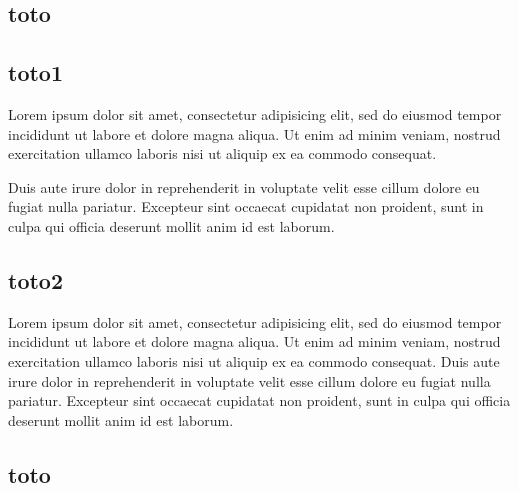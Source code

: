 \documentclass{book}
\begin{document}
\bhookXnote{\singlespacing}
\begin{pages}
\begin{Leftside}
\beginnumbering
\pstart
\section{toto}\skipnumbering
\subsection{toto1}\skipnumbering
\pend
\pstart
\begin{ledgroup}

\skipnumbering Lorem ipsum dolor sit amet, consectetur adipisicing elit, sed do eiusmod tempor incididunt ut labore et dolore magna aliqua. Ut enim ad minim veniam, nostrud exercitation ullamco laboris nisi ut aliquip ex ea commodo consequat.

Duis aute irure dolor in reprehenderit in voluptate velit esse cillum dolore eu fugiat nulla pariatur. Excepteur sint occaecat cupidatat non proident, sunt in culpa qui officia deserunt mollit anim id est laborum.

\end{ledgroup}
\pend

\pstart
\subsection{toto2}
\pend
\pstart
\begin{ledgroup}

 Lorem ipsum dolor sit amet, consectetur adipisicing elit, sed do eiusmod tempor incididunt ut labore et dolore magna aliqua. Ut enim ad minim veniam, nostrud exercitation ullamco laboris nisi ut aliquip ex ea commodo consequat. Duis aute irure dolor in reprehenderit in voluptate velit esse cillum dolore eu fugiat nulla pariatur. Excepteur sint occaecat cupidatat non proident, sunt in culpa qui officia deserunt mollit anim id est laborum.
 
\end{ledgroup}
\pend
\endnumbering
\end{Leftside}

\begin{Rightside}
\beginnumbering

\pstart
\section{toto}\skipnumbering

\end{Rightside}
\end{pages}
\end{document}
